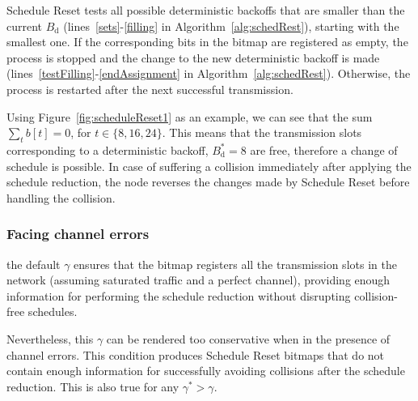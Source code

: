 		
		
		Schedule Reset tests all possible deterministic backoffs that are smaller than the current $B_{\text{d}}$ (lines~\ref{sets}-\ref{filling} in Algorithm~\ref{alg:schedRest}), starting with the smallest one. If the corresponding bits in the bitmap are registered as empty, the process is stopped and the change to the new deterministic backoff is made (lines~\ref{testFilling}-\ref{endAssignment} in Algorithm~\ref{alg:schedRest}). Otherwise, the process is restarted after the next successful transmission.
		
		Using Figure~\ref{fig:scheduleReset1} as an example, we can see that the sum $\sum\limits_{t} b[t]=0$, for $t\in\{8,16,24\}$. This means that the transmission slots corresponding to a deterministic backoff, $B^{*}_{\text{d}}=8$ are free, therefore a change of schedule is possible. In case of suffering a collision immediately after applying the schedule reduction, the node reverses the changes made by Schedule Reset before handling the collision.
		
	
		\subsubsection{Facing channel errors}\label{aggr}
		
		the default $\gamma$ ensures that the bitmap registers all the transmission slots in the network (assuming saturated traffic and a perfect channel), providing enough information for performing the schedule reduction without disrupting collision-free schedules. 
		
		Nevertheless, this $\gamma$ can be rendered too conservative when in the presence of channel errors. This condition produces Schedule Reset bitmaps that do not contain enough information for successfully avoiding collisions after the schedule reduction. This is also true for any $\gamma^{*}>\gamma$.
		
